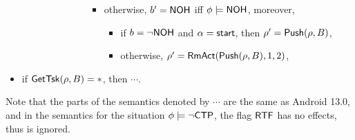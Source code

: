 \begin{itemize}
\begin{itemize}
\begin{itemize}
\begin{itemize}
\begin{itemize}
\begin{itemize}
\begin{itemize}
				\end{itemize}
				\item otherwise, $b' = {\sf NOH}$ iff $\phi \models {\sf NOH}$, moreover, 
				\begin{itemize}
					\item if $b = \neg {\sf NOH}$ and $\alpha = {\mathsf{start} }$, then $\rho'=\mathsf{Push}(\rho, B)$,
					\item otherwise, $\rho' = \mathsf{RmAct}(\mathsf{Push}(\rho, B), 1, 2)$, 
				\end{itemize}
			\end{itemize}
            \end{itemize}
        \end{itemize}
    \end{itemize}
\end{itemize}
\item if $\mathsf{GetTsk}(\rho, B) = *$, then $\cdots$. 
\end{itemize}

Note that the parts of the semantics denoted by $\cdots$ are the same as Android 13.0, and in the semantics for the situation $\phi \models \neg {\sf CTP}$, the flag ${\sf RTF}$ has no effects, thus is ignored.  






